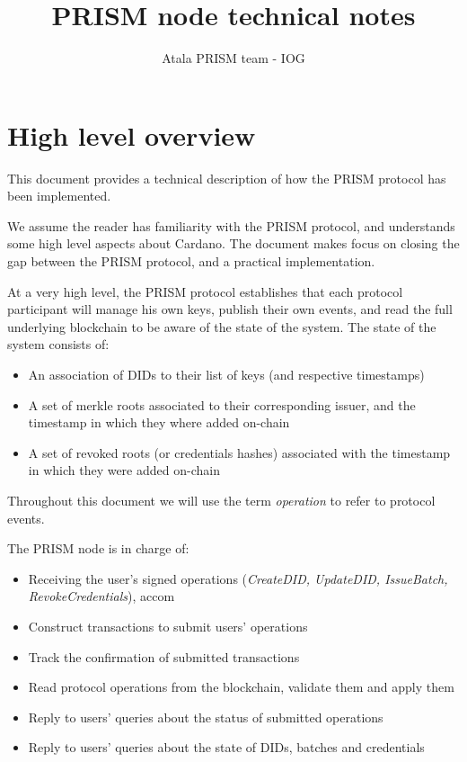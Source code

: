 \documentclass[10pt,a4paper]{article}
\title{PRISM node technical notes}
\author{Atala PRISM team - IOG}
\date{}
\begin{document}
\maketitle 


\setcounter{tocdepth}{3} 

\tableofcontents 
\newpage 


\section{High level overview}

This document provides a technical description of how the PRISM protocol has been implemented.

We assume the reader has familiarity with the PRISM protocol, and understands some high level aspects about Cardano. The document makes focus on closing the gap between the PRISM protocol, and a practical implementation.

At a very high level, the PRISM protocol establishes that each protocol participant will manage his own keys, publish their own events, and read the full underlying blockchain to be aware of the state of the system. The state of the system consists of:
\begin{itemize}
  \item An association of DIDs to their list of keys (and respective timestamps)
  \item A set of merkle roots associated to their corresponding issuer, and the timestamp in which they where added on-chain
  \item A set of revoked roots (or credentials hashes) associated with the timestamp in which they were added on-chain
\end{itemize}

Throughout this document we will use the term \emph{operation} to refer to protocol events. 

The PRISM node is in charge of:
\begin{itemize}
  \item Receiving the user's signed operations (\emph{CreateDID, UpdateDID, IssueBatch, RevokeCredentials}), accom
  \item Construct transactions to submit users' operations
  \item Track the confirmation of submitted transactions
  \item Read protocol operations from the blockchain, validate them and apply them
  \item Reply to users' queries about the status of submitted operations
  \item Reply to users' queries about the state of DIDs, batches and credentials
\end{itemize}
\end{document}
